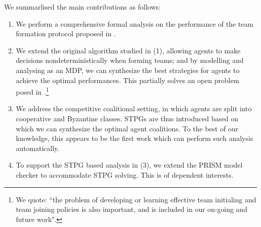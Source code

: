 \documentclass{llncs}
\newcommand{\comment}[1]{\marginpar{\footnotesize \color{red} \textsf{#1}}}
\begin{document}
%


We summarlised the main contributions as follows:
\begin{enumerate}
  \item We perform a comprehensive formal analysis on the performance of the team formation protocol proposed in \cite{gaston2005agent}.
      
  \item  We extend the original algorithm studied in (1), allowing agents to make decisions nondeterministically when forming teams; and by modelling and analysing as an MDP, we can synthesize the best strategies for agents to achieve the optimal performances. This partially solves an open problem posed in \cite{gaston2005agent}.\footnote{We quote: ``the problem of developing or learning effective team initialing and team joining policies is also important, and is included in our on-going and future work".}
      
  \item  We address the competitive coalitional setting, in which agents are split into cooperative and Byzantine classes. STPGs are thus introduced based on which we can synthesize the optimal agent coalitions. To the best of our knowledge, this appears to be the first work which can perform such analysis automatically.
      
  \item To support the STPG based analysis in (3), we extend the PRISM model checker to accommodate STPG solving. This is of dependent interests.
\end{enumerate}
\end{document}
